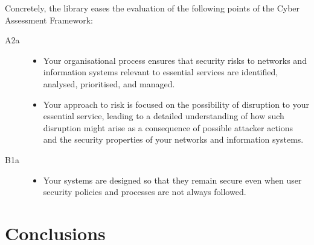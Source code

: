 \documentclass{scrreprt}
\begin{document}
Concretely, the library eases the evaluation of the following points of the
Cyber Assessment Framework:

\begin{description}
    \item [A2a]
        \begin{itemize}
            \item Your organisational process ensures that security risks to
                networks and information systems relevant to essential services
                are identified, analysed, prioritised, and managed.
            \item Your approach to risk is focused on the possibility of
                disruption to your essential service, leading to a detailed
                understanding of how such disruption might arise as a
                consequence of possible attacker actions and the security
                properties of your networks and information systems.
        \end{itemize}

    \item [B1a]
        \begin{itemize}
            \item Your systems are designed so that they remain secure even when
                user security policies and processes are not always followed.
        \end{itemize}
\end{description}


\chapter{Conclusions}
\label{conclusions}



\end{document}
